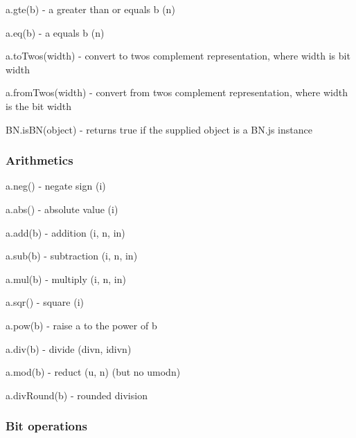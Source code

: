 \begin{DoxyItemize}
\item {\ttfamily a.\+gte(b)} -\/ {\ttfamily a} greater than or equals {\ttfamily b} ({\ttfamily n})
\item {\ttfamily a.\+eq(b)} -\/ {\ttfamily a} equals {\ttfamily b} ({\ttfamily n})
\item {\ttfamily a.\+to\+Twos(width)} -\/ convert to two\textquotesingle{}s complement representation, where {\ttfamily width} is bit width
\item {\ttfamily a.\+from\+Twos(width)} -\/ convert from two\textquotesingle{}s complement representation, where {\ttfamily width} is the bit width
\item {\ttfamily B\+N.\+is\+B\+N(object)} -\/ returns true if the supplied {\ttfamily object} is a B\+N.\+js instance
\end{DoxyItemize}

\subsubsection*{Arithmetics}


\begin{DoxyItemize}
\item {\ttfamily a.\+neg()} -\/ negate sign ({\ttfamily i})
\item {\ttfamily a.\+abs()} -\/ absolute value ({\ttfamily i})
\item {\ttfamily a.\+add(b)} -\/ addition ({\ttfamily i}, {\ttfamily n}, {\ttfamily in})
\item {\ttfamily a.\+sub(b)} -\/ subtraction ({\ttfamily i}, {\ttfamily n}, {\ttfamily in})
\item {\ttfamily a.\+mul(b)} -\/ multiply ({\ttfamily i}, {\ttfamily n}, {\ttfamily in})
\item {\ttfamily a.\+sqr()} -\/ square ({\ttfamily i})
\item {\ttfamily a.\+pow(b)} -\/ raise {\ttfamily a} to the power of {\ttfamily b}
\item {\ttfamily a.\+div(b)} -\/ divide ({\ttfamily divn}, {\ttfamily idivn})
\item {\ttfamily a.\+mod(b)} -\/ reduct ({\ttfamily u}, {\ttfamily n}) (but no {\ttfamily umodn})
\item {\ttfamily a.\+div\+Round(b)} -\/ rounded division
\end{DoxyItemize}

\subsubsection*{Bit operations}


